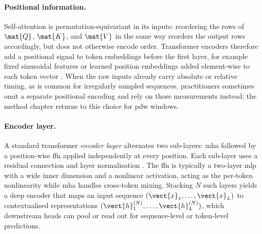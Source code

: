 \paragraph{Positional information.}
Self-attention is permutation-equivariant in its inputs: reordering the rows of $\mat{Q}$, $\mat{K}$, and $\mat{V}$ in the same way reorders the output rows accordingly, but does not otherwise encode order.
Transformer encoders therefore add a positional signal to token embeddings before the first layer, for example fixed sinusoidal features or learned position embeddings added element-wise to each token vector \parencite{vaswani2017attention,devlin2019bert}.
When the raw inputs already carry absolute or relative timing, as is common for irregularly sampled sequences, practitioners sometimes omit a separate positional encoding and rely on those measurements instead; the method chapter returns to this choice for \gls{pdw} windows.

\paragraph{Encoder layer.}
A standard transformer \emph{encoder layer} alternates two sub-layers: \gls{mha} followed by a position-wise \gls{ffn} applied independently at every position.
Each sub-layer uses a residual connection and layer normalisation \parencite{vaswani2017attention}.
The \gls{ffn} is typically a two-layer \gls{mlp} with a wide inner dimension and a nonlinear activation, acting as the per-token nonlinearity while \gls{mha} handles cross-token mixing.
Stacking $N$ such layers yields a deep encoder that maps an input sequence $(\vect{x}_1,\ldots,\vect{x}_L)$ to contextualised representations $(\vect{h}^{(N)}_1,\ldots,\vect{h}^{(N)}_L)$, which downstream heads can pool or read out for sequence-level or token-level predictions.
